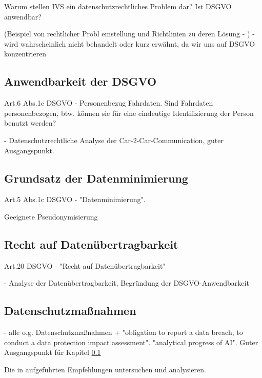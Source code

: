 Warum stellen IVS ein datenschutzrechtliches Problem dar? Ist DSGVO anwendbar? 

(Beispiel von rechtlicher Probl	emstellung und Richtlinien zu deren Lösung - \cite{EUCooperativeV2X} ) - wird wahrscheinlich nicht behandelt oder kurz erwähnt, da wir uns auf DSGVO konzentrieren

\subsection{Anwendbarkeit der DSGVO}
\label{sec:SecondContentSection:SecondSubsection}

Art.6 Abs.1c DSGVO - Personenbezug Fahrdaten. Sind Fahrdaten personenbezogen, btw. können sie für eine eindeutige Identifizierung der Person benutzt werden?

\cite{Weichert2016} - Datenschutzrechtliche Analyse der Car-2-Car-Communication, guter Ausgangspunkt.

\subsection{Grundsatz der Datenminimierung}

Art.5 Abs.1c DSGVO - "Datenminimierung". 

Geeignete Pseudonymisierung

\subsection{Recht auf Datenübertragbarkeit}

Art.20 DSGVO - "Recht auf Datenübertragbarkeit"

\cite{Straub2018} - Analyse der Datenübertragbarkeit, Begründung der DSGVO-Anwendbarkeit

\subsection{Datenschutzmaßnahmen}

\cite{Seewald2018} - alle o.g. Datenschutzmaßnahmen + "obligation to report a data breach, to conduct a data protection impact assessment". "analytical progress of AI". Guter Ausgangspunkt für Kapitel \ref{sec:SecondContentSection:SecondSubsection}

Die in \cite{Kiometzis2017} aufgeführten Empfehlungen untersuchen und analysieren. 

